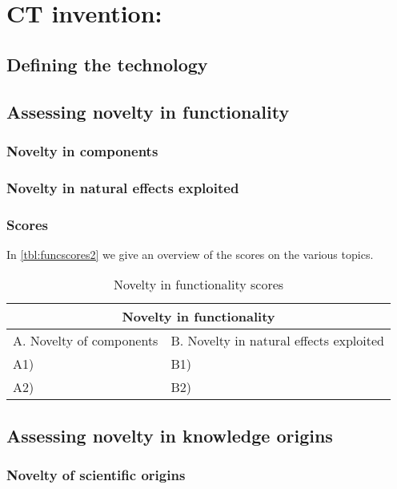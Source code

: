 \section{CT invention: }
\subsection{Defining the technology}

\subsection{Assessing novelty in functionality}

\subsubsection{Novelty in components}

\subsubsection{Novelty in natural effects exploited}

\subsubsection{Scores}
In \autoref{tbl:funcscores2} we give an overview of the scores on the various
topics.

\begin{table}[h]
\centering
\begin{tabular}{l l}
\hline
\multicolumn{2}{|c|}{Novelty in functionality} \\
\hline
A. Novelty of components & B. Novelty in natural effects exploited\\
A1) & B1)\\ 
A2) & B2)\\ 
\hline
\end{tabular}
\caption{Novelty in functionality scores}
\label{tbl:funcscores2}
\end{table}

\subsection{Assessing novelty in knowledge origins}
\subsubsection{Novelty of scientific origins}

